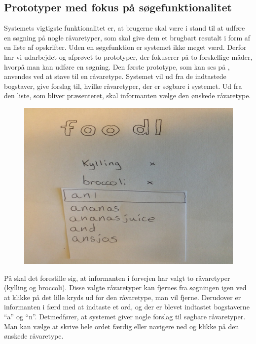 \subsection{Prototyper med fokus på søgefunktionalitet}
\label{subsec:prototype1}

Systemets vigtigste funktionalitet er, at brugerne skal være i stand til at udføre en søgning på nogle råvaretyper, som skal give dem et brugbart resutalt i form af en liste af opskrifter. Uden en søgefunktion er systemet ikke meget værd. Derfor har vi udarbejdet og afprøvet to prototyper, der fokuserer på to forskellige måder, hvorpå man kan udføre en søgning. Den første prototype, som kan ses på , anvendes ved at stave til en råvaretype. Systemet vil ud fra de indtastede bogstaver, give forslag til, hvilke råvaretyper, der er søgbare i systemet. Ud fra den liste, som bliver præsenteret, skal informanten vælge den ønskede råvaretype.

\begin{figure}[H]
	\centering
	\includegraphics[scale=0.7]{billeder/prototyper/prototype1a.png}
	\label{fig:prototype1adesign}
\end{figure}

På  skal det forestille sig, at informanten i forvejen har valgt to råvaretyper (kylling og broccoli). Disse valgte råvaretyper kan fjernes fra søgningen igen ved at klikke på det lille kryds ud for den råvaretype, man vil fjerne. Derudover er informanten i færd med at indtaste et ord, og der er blevet indtastet bogstaverne ``a'' og ``n''. Detmedfører, at systemet giver nogle forslag til søgbare råvaretyper. Man kan vælge at skrive hele ordet færdig eller navigere ned og klikke på den ønskede råvaretype.

